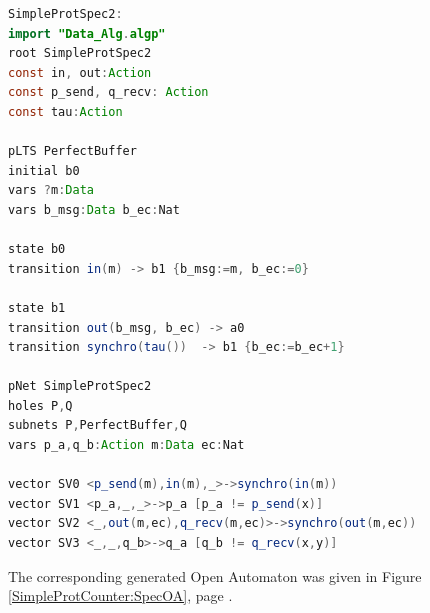 \documentclass{lmcs}
\begin{document}
\begin{lstlisting}[basicstyle=\scriptsize\ttfamily, language=java, frame=single]
SimpleProtSpec2:
import "Data_Alg.algp"
root SimpleProtSpec2
const in, out:Action
const p_send, q_recv: Action
const tau:Action

pLTS PerfectBuffer
initial b0 
vars ?m:Data
vars b_msg:Data b_ec:Nat

state b0
transition in(m) -> b1 {b_msg:=m, b_ec:=0}

state b1
transition out(b_msg, b_ec) -> a0
transition synchro(tau())  -> b1 {b_ec:=b_ec+1}

pNet SimpleProtSpec2
holes P,Q
subnets P,PerfectBuffer,Q
vars p_a,q_b:Action m:Data ec:Nat

vector SV0 <p_send(m),in(m),_>->synchro(in(m))
vector SV1 <p_a,_,_>->p_a [p_a != p_send(x)]
vector SV2 <_,out(m,ec),q_recv(m,ec)>->synchro(out(m,ec))
vector SV3 <_,_,q_b>->q_a [q_b != q_recv(x,y)]

  \end{lstlisting}




\bigskip
The corresponding generated Open Automaton was given in Figure \ref{SimpleProtCounter:SpecOA},
page \pageref{SimpleProtCounter:SpecOA}.\\
\end{document}
